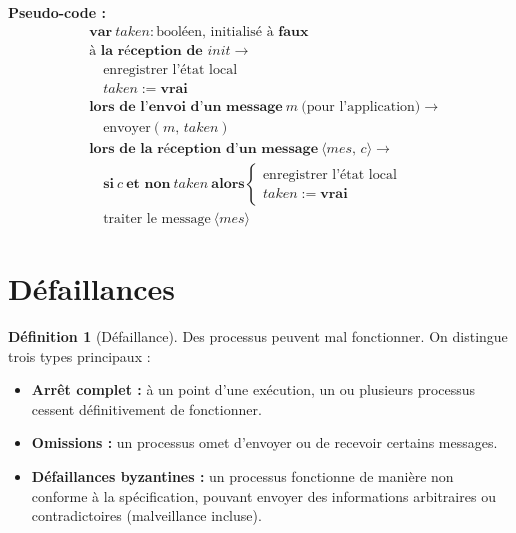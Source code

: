 \documentclass[12pt,a4paper]{article}
\theoremstyle{definition}
\newtheorem{definition}{Définition}[section]
\theoremstyle{plain}
\theoremstyle{remark}
\begin{document}
\bigskip
\noindent\textbf{Pseudo-code :}
\begin{align*}
&\textbf{var}\ \mathit{taken} : \text{booléen, initialisé à } \mathbf{faux}\\[6pt]
&\textbf{à la réception de } \mathit{init} \longrightarrow\\
&\quad \text{enregistrer l'état local}\\
&\quad \mathit{taken} := \mathbf{vrai}\\[6pt]
&\textbf{lors de l'envoi d'un message}\ m\ \text{(pour l'application)} \longrightarrow\\
&\quad \text{envoyer}(m,\, \mathit{taken})\\[6pt]
&\textbf{lors de la réception d'un message}\ \langle \mathit{mes},\, c \rangle \longrightarrow\\
&\quad \textbf{si}\ c\ \textbf{et non}\ \mathit{taken}\ \textbf{alors}
\begin{cases}
  \text{enregistrer l'état local}\\
  \mathit{taken} := \mathbf{vrai}
\end{cases}\\
&\quad \text{traiter le message}\ \langle \mathit{mes} \rangle
\end{align*}

\section{Défaillances}

\begin{definition}[Défaillance]
Des processus peuvent mal fonctionner. On distingue trois types principaux :
\begin{itemize}
  \item \textbf{Arrêt complet :} à un point d'une exécution, un ou plusieurs processus cessent
        définitivement de fonctionner.
  \item \textbf{Omissions :} un processus omet d'envoyer ou de recevoir certains messages.
  \item \textbf{Défaillances byzantines :} un processus fonctionne de manière non conforme à
        la spécification, pouvant envoyer des informations arbitraires ou contradictoires
        (malveillance incluse).
\end{itemize}
\end{definition}
\end{document}
